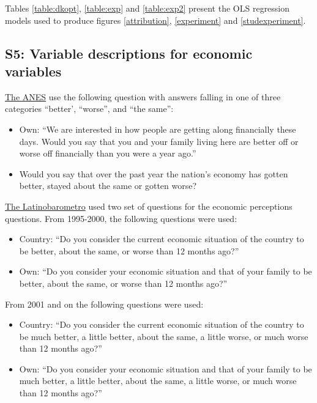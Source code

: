 \documentclass[a4paper,11pt]{article}
\begin{document}
	Tables \ref{table:dkopt}, \ref{table:exp} and \ref{table:exp2} present the OLS regression models used to produce figures \ref{attribution}, \ref{experiment} and \ref{studexperiment}.
	
	
	
	
	
	
	
	
	
	\newpage
	
	\subsection*{S5: Variable descriptions for economic variables}
	
	\ul{The ANES} use the following question with answers falling in one of three categories ``better', ``worse'', and  ``the same'':
	\begin{itemize}
		\item Own: ``We are interested in how people are getting along financially these days. Would you say that you and your family living here are better off or worse off financially than you were a year ago.''
		\item Would you say that over the past year the nation's economy has gotten  better, stayed about the same or gotten worse?
	\end{itemize}  
	
	
	\noindent \ul{The Latinobarometro} used two set of questions  for the economic perceptions questions. From 1995-2000, the following questions were used:
	
	\begin{itemize}
		\item Country: “Do you consider the current economic situation of the country to be better, about the same, or worse than 12 months ago?”
		
		\item  Own: “Do you consider your economic situation and that of your family to be better, about the same, or worse than 12 months ago?”	
	\end{itemize}  
	
	From 2001 and on the following questions were used:
	
	\begin{itemize}
		\item Country: “Do you consider the current economic situation of the country to be much better, a little better, about the same, a little worse, or much worse than 12 months ago?”
		\item Own: “Do you consider your economic situation and that of your family to be much better, a little better, about the same, a little worse, or much worse than 12 months ago?”
		
	\end{itemize}  
	
\end{document}
